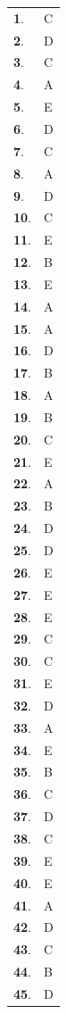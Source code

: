 \documentclass[letterstyle,12pt]{extarticle}
\begin{document}
\begin{supertabular}{ll}
{\bf1}. & C \\ 
{\bf2}. & D \\ 
{\bf3}. & C \\ 
{\bf4}. & A \\ 
{\bf5}. & E \\ 
{\bf6}. & D \\ 
{\bf7}. & C \\ 
{\bf8}. & A \\ 
{\bf9}. & D \\ 
{\bf10}. & C \\ 
{\bf11}. & E \\ 
{\bf12}. & B \\ 
{\bf13}. & E \\ 
{\bf14}. & A \\ 
{\bf15}. & A \\ 
{\bf16}. & D \\ 
{\bf17}. & B \\ 
{\bf18}. & A \\ 
{\bf19}. & B \\ 
{\bf20}. & C \\ 
{\bf21}. & E \\ 
{\bf22}. & A \\ 
{\bf23}. & B \\ 
{\bf24}. & D \\ 
{\bf25}. & D \\ 
{\bf26}. & E \\ 
{\bf27}. & E \\ 
{\bf28}. & E \\ 
{\bf29}. & C \\ 
{\bf30}. & C \\ 
{\bf31}. & E \\ 
{\bf32}. & D \\ 
{\bf33}. & A \\ 
{\bf34}. & E \\ 
{\bf35}. & B \\ 
{\bf36}. & C \\ 
{\bf37}. & D \\ 
{\bf38}. & C \\ 
{\bf39}. & E \\ 
{\bf40}. & E \\ 
{\bf41}. & A \\ 
{\bf42}. & D \\ 
{\bf43}. & C \\ 
{\bf44}. & B \\ 
{\bf45}. & D \\ 

\end{supertabular}
\end{document}
